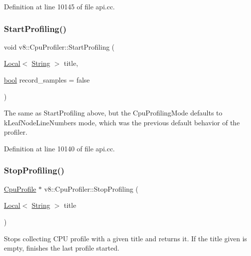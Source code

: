 Definition at line 10145 of file api.\+cc.

\mbox{\label{classv8_1_1CpuProfiler_a7a9b75d3d7285d90344e1b8f14e97076}} 
\subsubsection{\texorpdfstring{Start\+Profiling()}{StartProfiling()}\hspace{0.1cm}{\footnotesize\ttfamily [2/2]}}
{\footnotesize\ttfamily void v8\+::\+Cpu\+Profiler\+::\+Start\+Profiling (\begin{DoxyParamCaption}\item[{\mbox{\hyperlink{classv8_1_1Local}{Local}}$<$ \mbox{\hyperlink{classv8_1_1String}{String}} $>$}]{title,  }\item[{\mbox{\hyperlink{classbool}{bool}}}]{record\+\_\+samples = {\ttfamily false} }\end{DoxyParamCaption})}

The same as Start\+Profiling above, but the Cpu\+Profiling\+Mode defaults to k\+Leaf\+Node\+Line\+Numbers mode, which was the previous default behavior of the profiler. 

Definition at line 10140 of file api.\+cc.

\mbox{\label{classv8_1_1CpuProfiler_aa25e1c2d218e4206311e7dff890c0009}} 
\subsubsection{\texorpdfstring{Stop\+Profiling()}{StopProfiling()}}
{\footnotesize\ttfamily \mbox{\hyperlink{classv8_1_1CpuProfile}{Cpu\+Profile}} $\ast$ v8\+::\+Cpu\+Profiler\+::\+Stop\+Profiling (\begin{DoxyParamCaption}\item[{\mbox{\hyperlink{classv8_1_1Local}{Local}}$<$ \mbox{\hyperlink{classv8_1_1String}{String}} $>$}]{title }\end{DoxyParamCaption})}

Stops collecting C\+PU profile with a given title and returns it. If the title given is empty, finishes the last profile started. 

